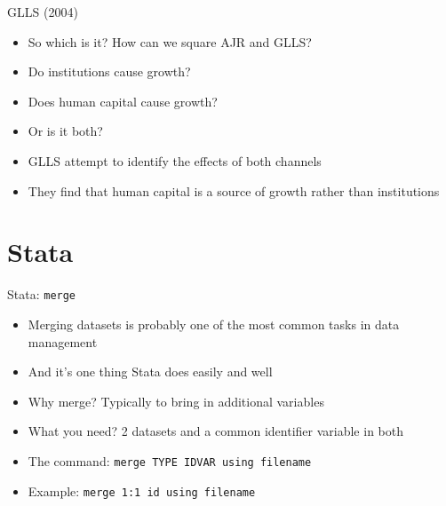 \documentclass[11pt,notes=hide,aspectratio=169,mathserif]{beamer}
\begin{document}
\begin{frame}{GLLS (2004)}
\begin{itemize}
\item So which is it? How can we square AJR and GLLS?
\item Do institutions cause growth? 
\item Does human capital cause growth?
\item Or is it both?
\item GLLS attempt to identify the effects of both channels 
\item They find that human capital is a source of growth rather than institutions
\end{itemize}
\end{frame}

\section*{Stata}

\begin{frame}{Stata: \texttt{merge}}
\begin{itemize}
\item Merging datasets is probably one of the most common tasks in data management
\item And it's one thing Stata does easily and well
\item Why merge? Typically to bring in additional variables
\item What you need? 2 datasets and a common identifier variable in both
\item The command: \texttt{merge TYPE IDVAR using filename}
\item Example: \texttt{merge 1:1 id using filename}
\end{itemize}
\end{frame}
\end{document}
